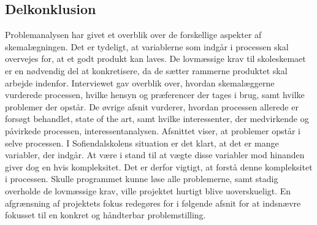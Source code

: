 \subsection{Delkonklusion}
Problemanalysen har givet et overblik over de forskellige aspekter af skemalægningen. Det er tydeligt, at variablerne som indgår i processen skal overvejes for, at et godt produkt kan laves. De lovmæssige krav til skoleskemaet er en nødvendig del at konkretisere, da de sætter rammerne produktet skal arbejde indenfor. Interviewet gav overblik over, hvordan skemalæggerne vurderede processen, hvilke hensyn og præferencer der tages i brug, samt hvilke problemer der opstår. De øvrige afsnit vurderer, hvordan processen allerede er forsøgt behandlet, state of the art, samt hvilke interessenter, der medvirkende og påvirkede processen, interessentanalysen. 
Afsnittet viser, at problemer opstår i selve processen. I Sofiendalskolens situation er det klart, at det er mange variabler, der indgår. At være i stand til at vægte disse variabler mod hinanden giver dog en hvis kompleksitet. Det er derfor vigtigt, at forstå denne kompleksitet i processen. Skulle programmet kunne løse alle problemerne, samt stadig overholde de lovmæssige krav, ville projektet hurtigt blive uoverskueligt. En afgrænsning af projektets fokus redegøres for i følgende afsnit for at indsnævre fokusset til en konkret og håndterbar problemstilling.
